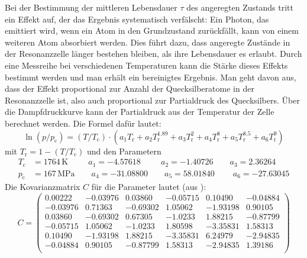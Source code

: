 Bei der Bestimmung der mittleren Lebensdauer $\tau$ des angeregten Zustands tritt ein Effekt auf,
der das Ergebnis systematisch verfälscht:
Ein Photon, das emittiert wird, wenn ein Atom in den Grundzustand zurückfällt,
kann von einem weiteren Atom absorbiert werden.
Dies führt dazu, dass angeregte Zustände in der Resonanzzelle länger bestehen bleiben,
als ihre Lebensdauer es erlaubt.
Durch eine Messreihe bei verschiedenen Temperaturen kann die Stärke dieses Effekts bestimmt werden und
man erhält ein bereinigtes Ergebnis.
Man geht davon aus, dass der Effekt proportional zur Anzahl der Quecksilberatome in der Resonanzzelle ist,
also auch proportional zur Partialdruck des Quecksilbers.
Über die Dampfdruckkurve kann der Partialdruck aus der Temperatur der Zelle berechnet werden.
Die Formel dafür lautet:
\begin{equation}
\label{eq:vaporpress}
\ln(p/p_{\text{c}})= (T/T_{\text{c}}) \cdot (a_1T_{\text{r}}^{}+a_2T_{\text{r}}^{1.89}+a_3T_{\text{r}}^{2}
+a_4T_{\text{r}}^{8}+a_5T_{\text{r}}^{8.5}+a_6T_{\text{r}}^{9})
\end{equation}
mit $T_{\text{r}}=1-(T/T_{\text{c}})$ und den Parametern
\begin{equation}
\label{eq:params}
\begin{split}
T_{\text{c}} &= 1764\,\text{K} \ \: \qquad a_1=-4.57618  \ \: \qquad a_2=-1.40726        \qquad a_3=2.36264\\
p_{\text{c}} &= 167\,\text{MPa}     \qquad a_4=-31.08800      \qquad a_5=58.01840  \  \qquad a_6=-27.63045
\end{split}
\end{equation}
Die Kovarianzmatrix $C$ für die Parameter lautet (aus \cite{manual}):
\begin{equation}
\label{eq:cov}
C=
\left(
\begin{array}{cccccc}
 0.00222 & -0.03976 & 0.03860 & -0.05715 & 0.10490 & -0.04884 \\
 -0.03976 & 0.71363 & -0.69302 & 1.05062 & -1.93198 & 0.90105 \\
 0.03860 & -0.69302 & 0.67305 & -1.0233 & 1.88215 & -0.87799 \\
 -0.05715 & 1.05062 & -1.0233 & 1.80598 & -3.35831 & 1.58313 \\
 0.10490 & -1.93198 & 1.88215 & -3.35831 & 6.24979 & -2.94835 \\
 -0.04884 & 0.90105 & -0.87799 & 1.58313 & -2.94835 & 1.39186 \\
\end{array}
\right)
\end{equation}